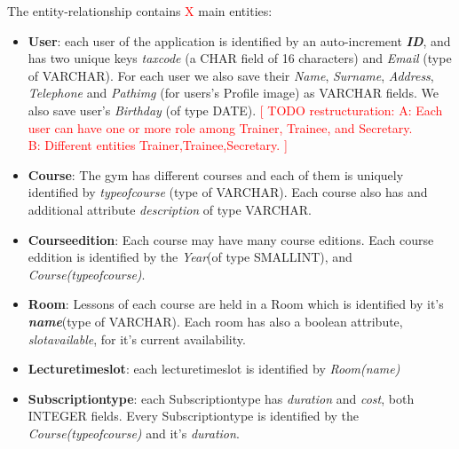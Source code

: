     The entity-relationship contains \textcolor{red}{X} main entities:
    \begin{itemize}
        \item 
        \textbf{User}: each user of the application is identified by an auto-increment \textit{\textbf{ID}}, and has two unique keys \textit{tax\textunderscore code} (a CHAR field of 16 characters) and \textit{Email} (type of VARCHAR). 
    	For each user we also save their \textit{Name}, \textit{Surname}, \textit{Address}, \textit{Telephone} and \textit{Pathimg} (for users's Profile image) as VARCHAR fields. We also save user's \textit{Birthday} (of type DATE).
    	\newline 
    	\newline 
    	\textcolor{red}{[ TODO restructuration: A: Each user can have one or more role among Trainer,  Trainee, and Secretary.\\
    	  B: Different entities Trainer,Trainee,Secretary. ]}
    	
    	\item 
    	\textbf{Course}: The gym has different courses and each of them is uniquely identified by 
    	\textit{type\textunderscore of\textunderscore course} (type of VARCHAR). Each course also has and additional attribute \textit{description} of type VARCHAR.
    	
    	\item 
    	\textbf{Course\textunderscore edition}: Each course may have many course editions. Each course eddition is identified by the \textit{Year}(of type SMALLINT), and \textit{Course(type\textunderscore of\textunderscore course)}.
    	
    	\item 
    	\textbf{Room}: Lessons of each course are held in a Room which is identified by it's \textbf{\textit{name}}(type of VARCHAR). Each room has also a boolean attribute, \textit{slot\textunderscore available}, for it's current availability.
    	
    	\item \textbf{Lecture\textunderscore time\textunderscore slot}: each lecture\textunderscore time\textunderscore slot is identified by \textit{Room(name)}
    	
    	\item \textbf{Subscription\textunderscore type}: each Subscription\textunderscore type has \textit{duration} and \textit{cost}, both INTEGER fields. Every Subscription\textunderscore type is identified by the \textit{Course(type\textunderscore of\textunderscore course)} and it's \textit{duration}.
    	

\end{itemize}
